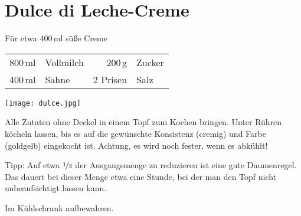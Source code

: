 \section*{Dulce di Leche-Creme}
\begin{minipage}{0.55\textwidth}
Für etwa 400\,ml süße Creme
\begin{table}[H]
\centering
\begin{tabular*}{1\textwidth}{rlrl}
800\,ml & Vollmilch & 200\,g & Zucker \\
400\,ml & Sahne & 2 Prisen & Salz \\
\end{tabular*}
\end{table}
\end{minipage}
\begin{minipage}{0.45\textwidth}
  \flushright
  \texttt{[image: dulce.jpg]}
\end{minipage}
\begin{Notes}
\item Alle Zutaten ohne Deckel in einem Topf zum Kochen bringen. Unter Rühren köcheln lassen, bis es auf die gewünschte Konsistenz (cremig) und Farbe (goldgelb) eingekocht ist. Achtung, es wird noch fester, wenn es abkühlt! 
\item Tipp: Auf etwa $\nicefrac{1}{3}$ der Ausgangsmenge zu reduzieren ist eine gute Daumenregel. Das dauert bei dieser Menge etwa eine Stunde, bei der man den Topf nicht unbeaufsichtigt lassen kann. 
\item Im Kühlschrank aufbewahren.
\end{Notes}
\newpage






